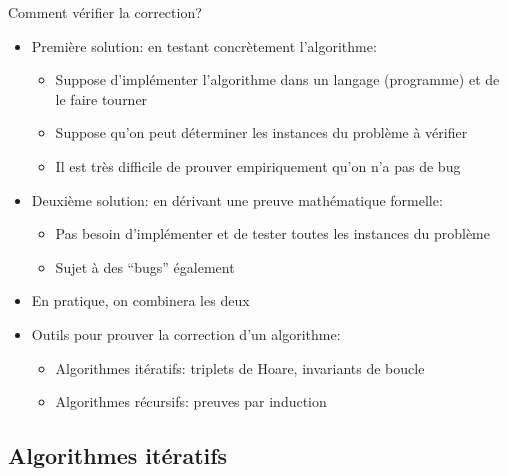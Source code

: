 \begin{frame}{Comment vérifier la correction?}
\begin{itemize}
\item Première solution: en \alert{testant} concrètement l'algorithme:
\begin{itemize}
\item Suppose d'implémenter l'algorithme dans un langage (programme)
  et de le faire tourner
\item Suppose qu'on peut déterminer les instances du problème à vérifier
\item Il est très difficile de prouver empiriquement qu'on n'a pas de bug %
\end{itemize}
\item Deuxième solution: en dérivant une \alert{preuve mathématique} formelle:
\begin{itemize}
\item Pas besoin d'implémenter et de tester toutes les instances du problème
\item Sujet à des ``bugs'' également
\end{itemize}
\item En pratique, on combinera les deux

\bigskip

\item Outils pour prouver la correction d'un algorithme:
\begin{itemize}
\item Algorithmes itératifs: triplets de Hoare, invariants de boucle%
\item Algorithmes récursifs: preuves par induction
\end{itemize}
\end{itemize}
\end{frame}

\subsection{Algorithmes itératifs}

